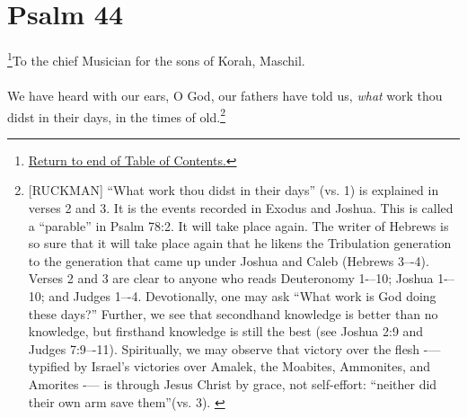 \chapter{Psalm 44}
\footnote{\textcolor[rgb]{0.00,0.25,0.00}{\hyperlink{TOC}{Return to end of Table of Contents.}}}\textcolor[rgb]{0.00,0.00,1.00}{To the chief Musician for the sons of Korah, Maschil.}\\
\\
\textcolor[rgb]{0.00,0.00,1.00}{We have heard with our ears, O God, our fathers have told us, \emph{what} work thou didst in their days, in the times of old.}\footnote{[RUCKMAN] ``What work thou didst in their days'' (vs. 1) is explained in verses 2 and 3. It is the events recorded in Exodus and Joshua. This is called a ``parable'' in Psalm 78:2. It will take place again. The writer of Hebrews is so sure that it will take place again that he likens the Tribulation generation to the generation that came up under Joshua and Caleb (Hebrews 3–-4). Verses 2 and 3 are clear to anyone who reads Deuteronomy 1-–10; Joshua 1-–10; and Judges 1–-4. Devotionally, one may ask ``What work is God doing these days?'' Further, we see that secondhand knowledge is better than no knowledge, but firsthand knowledge is still the best (see Joshua 2:9 and Judges 7:9–-11). Spiritually, we may observe that victory over the flesh -— typified by Israel’s victories over Amalek, the Moabites, Ammonites, and Amorites -— is through Jesus Christ by grace, not self-effort: ``neither did their own arm save them''(vs. 3). \cite{Ruckman1992Psalms} }
